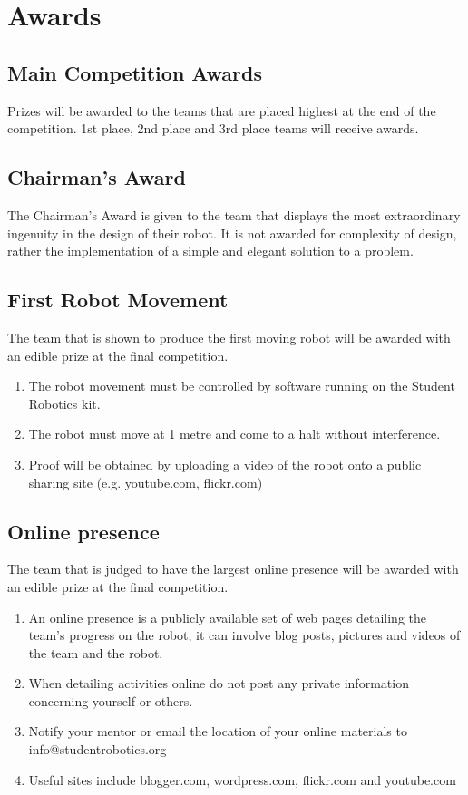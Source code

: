 \section {Awards}
\label{sec:Awards}

\subsection{Main Competition Awards}
Prizes will be awarded to the teams that are placed highest at the end of the competition. 1st place, 2nd place and 3rd place teams will receive awards.

\subsection{Chairman's Award}
The Chairman's Award is given to the team that displays the most extraordinary ingenuity in the design of their robot. It is not awarded for complexity of design, rather the implementation of a simple and elegant solution to a problem.

\subsection{First Robot Movement}
The team that is shown to produce the first moving robot will be awarded with an edible prize at the final competition.
\begin{enumerate}
\item The robot movement must be controlled by software running on the Student Robotics kit.
\item The robot must move at 1 metre and come to a halt without interference.
\item Proof will be obtained by uploading a video of the robot onto a public sharing site (e.g. youtube.com, flickr.com)
\end{enumerate}


\subsection{Online presence} 
The team that is judged to have the largest online presence will be awarded with an edible prize at the final competition.
\begin{enumerate}
\item An online presence is a publicly available set of web pages detailing the team's progress on the robot, it can involve blog posts, pictures and videos of the team and the robot.
\item When detailing activities online do not post any private information concerning yourself or others.
\item Notify your mentor or email the location of your online materials to info@studentrobotics.org
\item Useful sites include blogger.com, wordpress.com, flickr.com and youtube.com
\end{enumerate}
